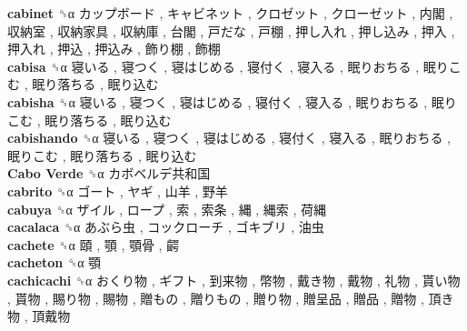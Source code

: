 \textbf{cabinet} ␝α   カップボード ,  キャビネット ,  クロゼット ,  クローゼット ,  内閣 ,  収納室 ,  収納家具 ,  収納庫 ,  台閣 ,  戸だな ,  戸棚 ,  押し入れ ,  押し込み ,  押入 ,  押入れ ,  押込 ,  押込み ,  飾り棚 ,  飾棚   \\
\textbf{cabisa} ␝α   寝いる ,  寝つく ,  寝はじめる ,  寝付く ,  寝入る ,  眠りおちる ,  眠りこむ ,  眠り落ちる ,  眠り込む   \\
\textbf{cabisha} ␝α   寝いる ,  寝つく ,  寝はじめる ,  寝付く ,  寝入る ,  眠りおちる ,  眠りこむ ,  眠り落ちる ,  眠り込む   \\
\textbf{cabishando} ␝α   寝いる ,  寝つく ,  寝はじめる ,  寝付く ,  寝入る ,  眠りおちる ,  眠りこむ ,  眠り落ちる ,  眠り込む   \\
\textbf{Cabo Verde} ␝α   カボベルデ共和国   \\
\textbf{cabrito} ␝α   ゴート ,  ヤギ ,  山羊 ,  野羊   \\
\textbf{cabuya} ␝α   ザイル ,  ロープ ,  索 ,  索条 ,  縄 ,  縄索 ,  荷縄   \\
\textbf{cacalaca} ␝α   あぶら虫 ,  コックローチ ,  ゴキブリ ,  油虫   \\
\textbf{cachete} ␝α   頤 ,  顎 ,  顎骨 ,  齶   \\
\textbf{cacheton} ␝α   顎   \\
\textbf{cachicachi} ␝α   おくり物 ,  ギフト ,  到来物 ,  幣物 ,  戴き物 ,  戴物 ,  礼物 ,  貰い物 ,  貰物 ,  賜り物 ,  賜物 ,  贈もの ,  贈りもの ,  贈り物 ,  贈呈品 ,  贈品 ,  贈物 ,  頂き物 ,  頂戴物   \\
